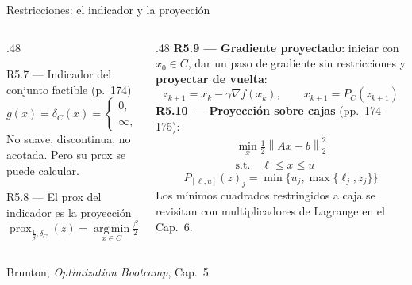 \documentclass[10pt,aspectratio=169]{beamer}
\newcommand{\fuente}{\vfill{\scriptsize\color{gray}Brunton, \emph{Optimization Bootcamp}, Cap.~5}}
\newcommand{\norm}[1]{\left\lVert #1 \right\rVert}
\newcommand{\prox}{\operatorname{prox}}
\newcommand{\proj}{\operatorname{proj}}
\newcommand{\argmin}{\operatorname*{arg\,min}}
\begin{document}
\begin{frame}{Restricciones: el indicador y la proyección}
  \small
  \begin{columns}[T,onlytextwidth]
    \begin{column}{.48\textwidth}
      \begin{block}{R5.7 --- Indicador del conjunto factible (p.~174)}
        \small
        \[
          g(x)=\delta_C(x) = \begin{cases}
            0, & x \in C\\
            \infty, & x \notin C
          \end{cases}
        \]
        No suave, discontinua, no acotada. Pero su prox se puede calcular.
      \end{block}
      \begin{block}{R5.8 --- El prox del indicador es la proyección}
        \small
        \[
          \prox_{\frac{1}{\beta},\delta_C}(z)
          = \argmin_{x\in C} \tfrac{\beta}{2}\norm{x-z}_2^2
          \equiv \proj_C(z)
        \]
      \end{block}
    \end{column}
    \begin{column}{.48\textwidth}
      \textbf{R5.9 --- Gradiente proyectado}: iniciar con $x_0\in C$, dar un
      paso de gradiente sin restricciones y \textbf{proyectar de vuelta}:
      \[
        z_{k+1} = x_k - \gamma\nabla f(x_k),
        \qquad x_{k+1} = P_C(z_{k+1})
      \]
      \textbf{R5.10 --- Proyección sobre cajas} (pp.~174--175):
      \begin{align}
        \min_x \tfrac{1}{2}\norm{Ax-b}_2^2 \tag{5.6a}\\
        \text{s.t.}\quad \ell \le x \le u \tag{5.6b}
      \end{align}
      \[
        P_{[\ell,u]}(z)_j = \min\{u_j, \max\{\ell_j, z_j\}\}
      \]
      {\footnotesize\color{gray}
       Los mínimos cuadrados restringidos a caja se revisitan con
       multiplicadores de Lagrange en el Cap.~6.}
    \end{column}
  \end{columns}
  \fuente
\end{frame}
\end{document}
